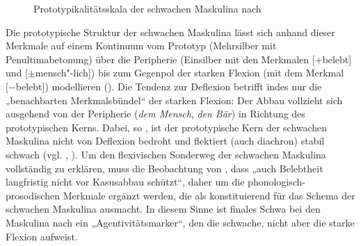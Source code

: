 \begin{figure}
\caption{Prototypikalitätsskala der schwachen Maskulina nach \citet[104]{Köpcke2002}}
\label{fig:1}
\end{figure}

Die prototypische Struktur der schwachen Maskulina lässt sich anhand dieser Merkmale auf einem Kontinuum vom Prototyp (Mehrsilber mit Penultimabetonung) über die Peripherie (Einsilber mit den Merkmalen [+belebt] und [${\pm}$mensch"-lich]) bis zum Gegenpol der starken Flexion (mit dem Merkmal [−belebt]) modellieren (). Die Tendenz zur Deflexion betrifft indes nur die „benachbarten Merkmalsbündel“ \citep[105]{Köpcke2002} der starken Flexion: Der Abbau vollzieht sich ausgehend von der Peripherie (\textit{dem Mensch}, \textit{den Bär}) in Richtung des prototypischen Kerns. Dabei, so \citet[105]{Köpcke2002}, ist der prototypische Kern der schwachen Maskulina nicht von Deflexion bedroht und flektiert (auch diachron) stabil schwach (vgl. \citealt[111]{Köpcke2000a}, \citealt{Thieroff2003}). Um den flexivischen Sonderweg der schwachen Maskulina vollständig zu erklären, muss die Beobachtung von \citet[212]{DammelGillmann2014}, dass „auch Belebtheit langfristig nicht vor Kasusabbau schützt“, daher um die phonologisch-prosodischen Merkmale ergänzt werden, die \citet{Köpcke2000a, Köpcke2002} als konstituierend für das Schema der schwachen Maskulina ausmacht. In diesem Sinne ist finales Schwa bei den Maskulina nach \citet[119]{Köpcke2000a} ein „Agentivitätsmarker“, den die schwache, nicht aber die starke Flexion aufweist.

